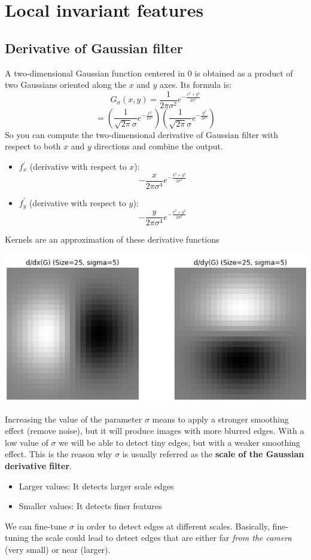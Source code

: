 \chapter{Local invariant features}
\section{Derivative of Gaussian filter}
A two-dimensional Gaussian function centered in 0 is obtained as a product of two Gaussians oriented along the $x$ and $y$ axes. Its formula is:
\[G_{\sigma}(x,y) = \frac{1}{2\pi\sigma^{2}}e^{-\frac{x^{2} + y^{2}}{2\sigma^{2}}}\]
\[= \left( \frac{1}{\sqrt{2\pi}\sigma}e^{-\frac{x^{2}}{2\sigma^{2}}}\right) 
    \left( \frac{1}{\sqrt{2\pi}\sigma}e^{-\frac{y^{2}}{2\sigma^{2}}}\right)\]
So you can compute the two-dimensional derivative of Gaussian filter with respect to both $x$ and $y$ directions and combine the output.

\begin{itemize}
    \item $f^{'}_{x}$ (derivative with respect to $x$):
    \[-\frac{x}{2\pi\sigma^4}e^{-\frac{x^2+y^2}{2\sigma^2}}\]
    \item $f^{'}_{y}$ (derivative with respect to $y$):
    \[-\frac{y}{2\pi\sigma^4}e^{-\frac{x^2+y^2}{2\sigma^2}}\]
\end{itemize}
Kernels are an approximation of these derivative functions
\begin{center}
    \includegraphics[scale = 0.6]{images/derivative gaussian.png}
\end{center}
Increasing the value of the parameter $\sigma$ means to apply a stronger smoothing effect (remove noise), but it will produce images with more blurred edges. With a low value of $\sigma$ we will be able to detect tiny edges, but with a weaker smoothing effect. This is the reason why $\sigma$ is usually referred as the \textbf{scale of the Gaussian derivative filter}.
\begin{itemize}
    \item Larger values: It detects larger scale edges
    \item Smaller values: It detects finer features
\end{itemize}
We can fine-tune $\sigma$ in order to detect edges at different scales. Basically, fine-tuning the scale could lead to detect edges that are either far \textit{from the camera} (very small) or near (larger).
